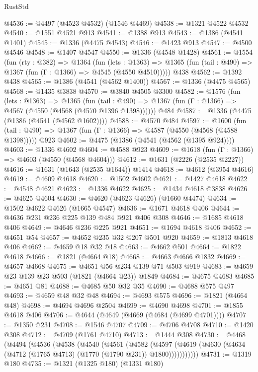 \begin{lexlean}{RustStd}
\begin{coremodule}
{\begin{coremodule}
{{{{{{{{{{{{{{@4536 := @4497 (@4523 @4532) (@1546 @4469)
@4538 := @1321 @4522 @4532
@4540 := @1551 @4521 @913
@4541 := @1388 @913
@4543 := @1386 (@4541 @1401)
@4545 := @1336 (@4475 @4543)
@4546 := @1423 @913
@4547 := @4500 @4546
@4548 := @1407 @4547
@4550 := @1336 (@4548 @1428)
@4561 := @1554
    (fun (rty : @382) =>
    @1364
      (fun (lets : @1363) =>
      @1365 (fun (tail : @490) => @1367 (fun (Γ : @1366) => @4545 (@4550 @4510)))))
    @438
@4562 := @1392 @438
@4565 := @1386 (@4541 (@4562 @1400))
@4567 := @1336 (@4475 @4565)
@4568 := @1435 @3838
@4570 := @3840 @4505 @3300
@4582 := @1576
    (fun (lets : @1363) =>
    @1365
      (fun (tail : @490) => @1367 (fun (Γ : @1366) => @4567 (@4550 (@4568 (@4570 @1396 @1398))))))
    @484
@4587 := @1336 (@4475 (@1386 (@4541 (@4562 @1602))))
@4588 := @4570 @484
@4597 := @1600
    (fun (tail : @490) => @1367 (fun (Γ : @1366) => @4587 (@4550 (@4568 (@4588 @1398)))))
    @923
@4602 := @4475 (@1386 (@4541 (@4562 (@1395 @924))))
@4603 := @1336 @4602
@4604 := @4588 @923
@4609 := @1618 (fun (Γ : @1366) => @4603 (@4550 (@4568 @4604)))
@4612 := @1631 (@2226 (@2535 @2227))
@4616 := @1631 (@1643 (@2535 @1644)) @1414
@4618 := @4612 (@3954 @4616)
@4619 := @4609 @4618
@4620 := @1502 @4602
@4621 := @1427 @4618
@4622 := @4548 @4621
@4623 := @1336 @4622
@4625 := @1434 @4618 @3838
@4626 := @4625 @4604
@4630 := @4620 (@4623 @4626) (@1660 @4474)
@4634 := @1502 @4622 @4626 (@1665 @4547)
@4636 := @1671 @4618 @406
@4644 := @4636 @231 @236 @225 @139 @484 @921 @406 @308
@4646 := @1685 @4618 @406
@4649 := @4646 @236 @225 @921
@4651 := @1694 @4618 @406
@4652 := @4651 @54
@4657 := @4652 @235 @32 @207 @501 @920
@4659 := @1813 @4618 @406
@4662 := @4659 @18 @32 @18
@4663 := @4662 @501
@4664 := @1822 @4618
@4666 := @1821 (@4664 @18)
@4668 := @4663 @4666 @1832
@4669 := @4657 @4668
@4675 := @4651 @56 @234 @139 @71 @503 @919
@4683 := @4659 @23 @139 @23 @503 (@1821 (@4664 @23)) @1849
@4684 := @4675 @4683
@4685 := @4651 @81
@4688 := @4685 @50 @32 @35
@4690 := @4688 @575 @497
@4693 := @4659 @48 @32 @48
@4694 := @4693 @575
@4696 := @1821 (@4664 @48)
@4698 := @4694 @4696 @2504
@4699 := @4690 @4698
@4701 := @1855 @4618 @406
@4706 := @4644 (@4649 (@4669 (@4684 (@4699 @4701))))
@4707 := @1350 @231
@4708 := @1546 @4707
@4709 := @4706 @4708
@4710 := @1420 @308
@4712 := @4709 (@1761 @4710)
@4713 := @1444 @308
@4730 := @4468
    (@4494
      (@4536
        (@4538
          (@4540
            (@4561
              (@4582
                (@4597
                  (@4619 (@4630 (@4634 (@4712 (@1765 @4713) (@1770 (@1790 @231)) @1800)))))))))))
@4731 := @1319 @180
@4735 := @1321 (@1325 @180) (@1331 @180)
}}}}}}}}}}}}}}
\end{coremodule}}
\end{coremodule}
\end{lexlean}
